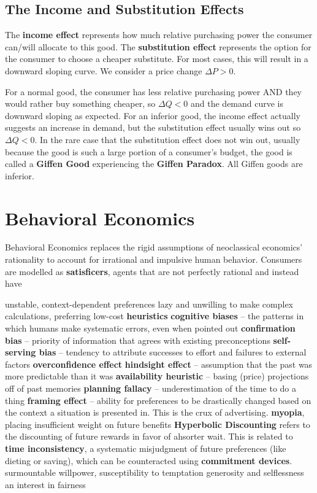 \documentclass{article}
\def\termB #1{\termbB{#1} --}
\def\termbB #1{\2 \textbf{#1}}
\begin{document}
\subsection{The Income and Substitution Effects}
The \textbf{income effect} represents how much relative purchasing power the consumer can/will allocate to this good.
The \textbf{substitution effect} represents the option for the consumer to choose a cheaper substitute.
For most cases, this will result in a downward sloping curve. We consider a price change $\Delta P > 0$.
\begin{outline}
	\1 For a normal good, the consumer has less relative purchasing power AND they would rather buy something cheaper, so $\Delta Q < 0$ and the demand curve is downward sloping as expected.
	\1 For an inferior good, the income effect actually suggests an increase in demand, but the substitution effect usually wins out so $\Delta Q < 0$.
	    \2 In the rare case that the substitution effect does not win out, usually because the good is such a large portion of a consumer's budget, the good is called a \textbf{Giffen Good} experiencing the \textbf{Giffen Paradox}. All Giffen goods are inferior.
\end{outline}

\section{Behavioral Economics}
Behavioral Economics replaces the rigid assumptions of neoclassical economics' rationality to account for irrational and impulsive human behavior.
Consumers are modelled as \textbf{satisficers}, agents that are not perfectly rational and instead have
\begin{outline}
    \1 unstable, context-dependent preferences
    \1 lazy and unwilling to make complex calculations, preferring low-cost \textbf{heuristics}
    \1 \textbf{cognitive biases} -- the patterns in which humans make systematic errors, even when pointed out
    \2 \textbf{confirmation bias} -- priority of information that agrees with existing preconceptions
    \2 \textbf{self-serving bias} -- tendency to attribute successes to effort and failures to external factors
    \termbB{overconfidence effect}
    \termB{hindsight effect} assumption that the past was more predictable than it was
    \termB{availability heuristic} basing (price) projections off of past memories
    \termB{planning fallacy} underestimation of the time to do a thing
    \termB{framing effect} ability for preferences to be drastically changed based on the context a situation is presented in. This is the crux of advertising.
    \2 \textbf{myopia}, placing insufficient weight on future benefits
    \3 \textbf{Hyperbolic Discounting} refers to the discounting of future rewards in favor of  ahsorter wait.
    \3 This is related to \textbf{time inconsistency}, a systematic misjudgment of future preferences (like dieting or saving), which can be counteracted using \textbf{commitment devices}.
    \1 surmountable willpower, susceptibility to temptation
    \1 generosity and selflessness
    \1 an interest in fairness
\end{outline}
\end{document}
